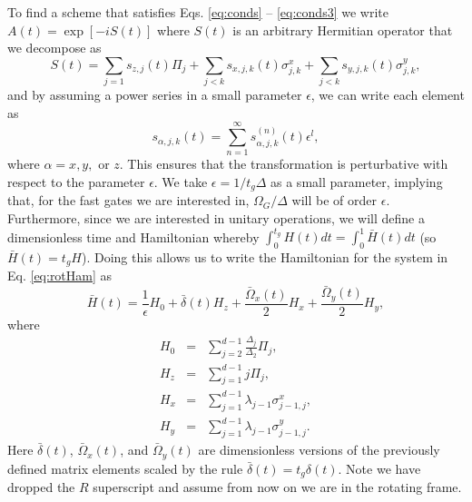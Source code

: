 \documentclass[pra,twocolumn,floatfix,superscriptaddress,eqsecnum]{revtex4-1}
\newcommand{\be}{\begin{equation}}
\newcommand{\ee}{\end{equation}}
\begin{document}
To find a scheme that satisfies Eqs. \eqref{eq:conds} -- \eqref{eq:conds3} we write $A(t)=\exp[-i S(t)]$ where $S(t)$ is an arbitrary Hermitian operator that we decompose as
\begin{equation}
S(t) = \sum_{j=1} s_{z,j}(t) \Pi_j + \sum_{j<k} s_{x,j,k}(t) \sigma^x_{j,k} +  \sum_{j<k}s_{y,j,k}(t) \sigma^y_{j,k},
\end{equation} and by assuming a power series in a small parameter $\epsilon$, we can write each element as
\be
s_{\alpha,j,k}(t) = \sum_{n=1}^{\infty} s^{(n)}_{\alpha,j,k}(t) \epsilon^l,
\ee where $\alpha =x,y,$ or $z$. This ensures that the transformation is perturbative with respect to the parameter $\epsilon$. We take $\epsilon=1/t_g\Delta$ as a small parameter, implying that, for the fast gates we are interested in, $\Omega_G/\Delta$ will be of order $\epsilon$. Furthermore, since we are interested in unitary operations, we will define a dimensionless time and Hamiltonian whereby $\int_0^{t_g} H(t)dt =\int_0^1 \bar H(t)dt$ (so $\bar H(t)=t_g H$).  Doing this allows us to write the Hamiltonian for the system in Eq. \eqref{eq:rotHam} as
\begin{equation}\label{eq:dimHam}
 \bar H(t) =\frac{1}{\epsilon} H_0 + \bar\delta(t) H_{z} + \frac{\bar\Omega_{x}(t)}{2} H_{x}+ \frac{\bar\Omega_{y}(t)}{2}  H_{y},
\end{equation} where
\begin{eqnarray}
H_0 &=& \sum_{j=2}^{d-1} \frac{\Delta_j}{\Delta_2}\Pi_j,\\
H_z &=& \sum_{j=1}^{d-1}j \Pi_j,\\
H_x &=& \sum_{j=1}^{d-1} \lambda_{j-1} \sigma_{j-1,j}^x, \\
H_y &=& \sum_{j=1}^{d-1} \lambda_{j-1} \sigma_{j-1,j}^y.
\end{eqnarray} Here $\bar\delta(t)$, $\bar\Omega_{x}(t)$, and $\bar\Omega_{y}(t)$ are dimensionless versions of the previously defined matrix elements scaled by the rule $\bar\delta(t)=t_g \delta(t)$. Note we have dropped the $R$ superscript and assume from now on we are in the rotating frame.
\end{document}

